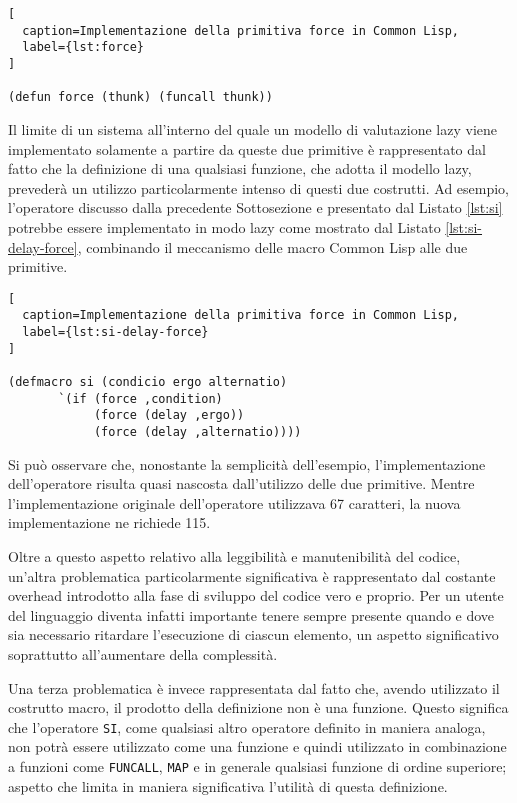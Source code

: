 \begin{lstlisting}[
  caption=Implementazione della primitiva force in Common Lisp,
  label={lst:force}
]

(defun force (thunk) (funcall thunk))

\end{lstlisting}

Il limite di un sistema all'interno del quale un modello di valutazione lazy
viene implementato solamente a partire da queste due primitive è rappresentato
dal fatto che la definizione di una qualsiasi funzione, che adotta il modello
lazy, prevederà un utilizzo particolarmente intenso di questi due costrutti. Ad
esempio, l'operatore discusso dalla precedente Sottosezione e presentato dal
Listato \ref{lst:si} potrebbe essere implementato in modo lazy come mostrato dal
Listato \ref{lst:si-delay-force}, combinando il meccanismo delle macro Common
Lisp alle due primitive.

\begin{lstlisting}[
  caption=Implementazione della primitiva force in Common Lisp,
  label={lst:si-delay-force}
]

(defmacro si (condicio ergo alternatio)
       `(if (force ,condition)
            (force (delay ,ergo))
            (force (delay ,alternatio))))

\end{lstlisting}

Si può osservare che, nonostante la semplicità dell'esempio, l'implementazione
dell'operatore risulta quasi nascosta dall'utilizzo delle due primitive. Mentre
l'implementazione originale dell'operatore utilizzava 67 caratteri, la nuova
implementazione ne richiede 115.

Oltre a questo aspetto relativo alla leggibilità e manutenibilità del codice,
un'altra problematica particolarmente significativa è rappresentato dal costante
overhead introdotto alla fase di sviluppo del codice vero e proprio. Per un
utente del linguaggio diventa infatti importante tenere sempre presente quando e
dove sia necessario ritardare l'esecuzione di ciascun elemento, un aspetto
significativo soprattutto all'aumentare della complessità.

Una terza problematica è invece rappresentata dal fatto che, avendo utilizzato
il costrutto macro, il prodotto della definizione non è una funzione. Questo
significa che l'operatore \texttt{SI}, come qualsiasi altro operatore definito
in maniera analoga, non potrà essere utilizzato come una funzione e quindi
utilizzato in combinazione a funzioni come \texttt{FUNCALL}, \texttt{MAP} e in
generale qualsiasi funzione di ordine superiore; aspetto che limita in maniera
significativa l'utilità di questa definizione.\\

